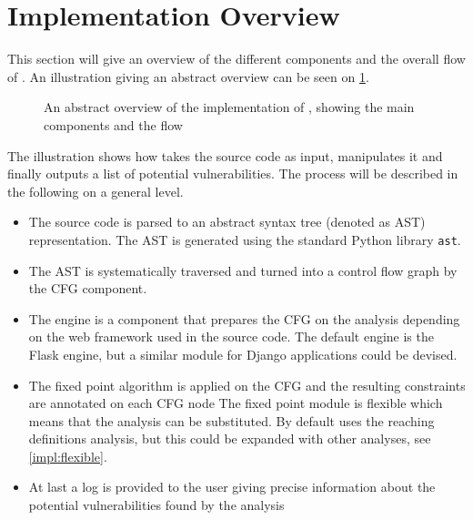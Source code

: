\section{Implementation Overview}\label{impl:overview}
This section will give an overview of the different components and the overall flow of \pyt{}.
An illustration giving an abstract overview can be seen on \cref{figure:implementation_overview}.

\begin{figure}
  
  \caption{An abstract overview of the implementation of \pyt{}, showing the main components and the flow}
  \label{figure:implementation_overview}
\end{figure}

The illustration shows how  \pyt{} takes the source code as input, manipulates it and finally outputs a list of potential vulnerabilities.
The process will be described in the following on a general level.

\begin{itemize}
\item The source code is parsed to an abstract syntax tree (denoted as AST) representation.
  The AST is generated using the standard Python library \texttt{ast}\cite{python_ast}.
\item The AST is systematically traversed and turned into a control flow graph by the CFG component.
\item The engine is a component that prepares the CFG on the analysis depending on the web framework used in the source code.
  The default engine is the Flask engine, but a similar module for Django applications could be devised.
\item The fixed point algorithm is applied on the CFG and the resulting constraints are annotated on each CFG node
  The fixed point module is flexible which means that the analysis can be substituted.
  By default \pyt{} uses the reaching definitions analysis, but this could be expanded with other analyses, see \cref{impl:flexible}.
\item At last a log is provided to the user giving precise information about the potential vulnerabilities found by the analysis
\end{itemize}
